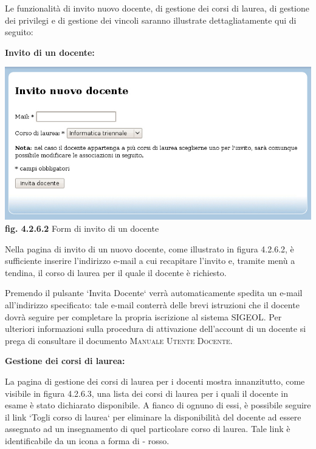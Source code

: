 \documentclass[11pt,a4paper]{article}
\begin{document}
Le funzionalità di invito nuovo docente, di gestione dei corsi di laurea, di gestione dei privilegi e di gestione dei vincoli saranno illustrate dettagliatamente qui di seguito:
\newline \newline
\begin{large}\textbf{Invito di un docente:}\end{large}

\bigskip
\begin{center}
	\includegraphics[scale=0.5]{images/invito_docenti.jpg}\\
	\textbf{fig. 4.2.6.2} Form di invito di un docente\\
\end{center}
\bigskip

Nella pagina di invito di un nuovo docente, come illustrato in figura 4.2.6.2, è sufficiente inserire l'indirizzo e-mail a cui recapitare l'invito e, tramite menù a tendina, il corso di laurea per il quale il docente è richiesto.

Premendo il pulsante `Invita Docente` verrà automaticamente spedita un e-mail all'indirizzo specificato: tale e-mail conterrà delle brevi istruzioni che il docente dovrà seguire per completare la propria iscrizione al sistema SIGEOL.
Per ulteriori informazioni sulla procedura di attivazione dell'account di un docente si prega di consultare il documento \textsc{Manuale Utente Docente}.
\newline \newline
\begin{large}\textbf{Gestione dei corsi di laurea:}\end{large}
\newline \newline
La pagina di gestione dei corsi di laurea per i docenti mostra innanzitutto, come visibile in figura 4.2.6.3, una lista dei corsi di laurea per i quali il docente in esame è stato dichiarato disponibile. A fianco di ognuno di essi, è possibile seguire il link `Togli corso di laurea` per eliminare la disponibilità del docente ad essere assegnato ad un insegnamento di quel particolare corso di laurea. Tale link è identificabile da un icona a forma di - rosso.
\end{document}
